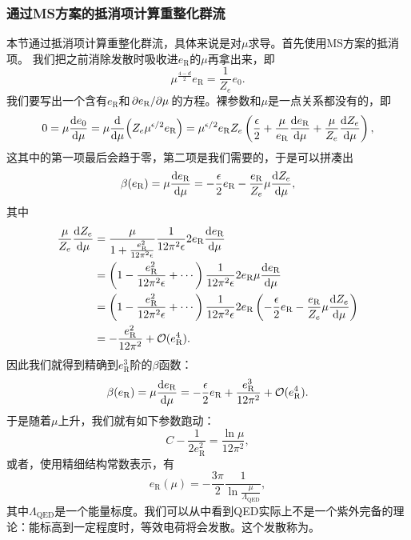 \subsubsection{通过MS方案的抵消项计算重整化群流}

本节通过抵消项计算重整化群流，具体来说是对$\mu$求导。首先使用MS方案的抵消项。
我们把之前消除发散时吸收进$e_\text{R}$的$\mu$再拿出来，即
\begin{equation}
    \mu^{\frac{4-d}{2}} e_\text{R} = \frac{1}{Z_e} e_0.
\end{equation}
我们要写出一个含有$e_\text{R}$和$\pdv*{e_\text{R}}{\mu}$的方程。裸参数和$\mu$是一点关系都没有的，即
\[
    0 = \mu \dv{e_0}{\mu} = \mu \dv{\mu} (Z_e \mu^{\epsilon / 2} e_\text{R}) = \mu^{\epsilon/2} e_\text{R} Z_e \left( \frac{\epsilon}{2} + \frac{\mu}{e_\text{R}} \dv{e_\text{R}}{\mu} + \frac{\mu}{Z_e} \dv{Z_e}{\mu} \right),
\]
这其中的第一项最后会趋于零，第二项是我们需要的，于是可以拼凑出
\[
    \beta(e_\text{R}) = \mu \dv{e_\text{R}}{\mu} = - \frac{\epsilon}{2} e_\text{R} - \frac{e_\text{R}}{Z_e} \mu \dv{Z_e}{\mu},
\]
其中
\[
    \begin{aligned}
        \frac{\mu}{Z_e} \dv{Z_e}{\mu} &= \frac{\mu}{1 + \frac{e_\text{R}^2}{12 \pi^2 \epsilon}} \frac{1}{12\pi^2 \epsilon} 2 e_\text{R} \dv{e_\text{R}}{\mu} \\
        &= \left( 1 - \frac{e_\text{R}^2}{12 \pi^2 \epsilon} + \cdots \right) \frac{1}{12 \pi^2 \epsilon} 2 e_\text{R} \mu \dv{e_\text{R}}{\mu} \\
        &= \left( 1 - \frac{e_\text{R}^2}{12 \pi^2 \epsilon} + \cdots \right) \frac{1}{12 \pi^2 \epsilon} 2 e_\text{R} \left( - \frac{\epsilon}{2} e_\text{R} - \frac{e_\text{R}}{Z_e} \mu \dv{Z_e}{\mu} \right) \\
        &= - \frac{e_\text{R}^2}{12 \pi^2} + \mathcal{O}{(}e_\text{R}^4).
    \end{aligned}
\]
因此我们就得到精确到$e_\text{R}^3$阶的$\beta$函数：
\begin{equation}
    \beta(e_\text{R}) = \mu \dv{e_\text{R}}{\mu} = - \frac{\epsilon}{2} e_\text{R} + \frac{e_\text{R}^3}{12 \pi^2} + \mathcal{O}{(}e_\text{R}^4).
\end{equation}
于是随着$\mu$上升，我们就有如下参数跑动：
\[
    C - \frac{1}{2 e_\text{R}^2} = \frac{\ln \mu}{12 \pi^2},
\]
或者，使用精细结构常数表示，有
\begin{equation}
    e_\text{R}(\mu) = - \frac{3 \pi}{2} \frac{1}{\ln \frac{\mu}{\Lambda_\text{QED}}},
\end{equation}
其中$\Lambda_\text{QED}$是一个能量标度。我们可以从中看到QED实际上不是一个紫外完备的理论：能标高到一定程度时，等效电荷将会发散。这个发散称为。

